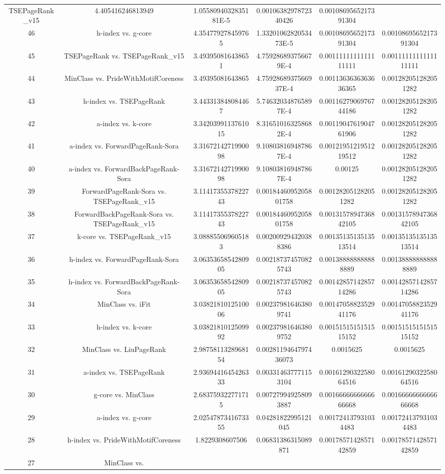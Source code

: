 \documentclass[a4paper,10pt]{article}
\begin{document}
\begin{landscape}
\begin{table}[!htp]
\begin{tabular}{cccccc}
TSEPageRank_v15&4.405416246813949&1.0558094032835181E-5&0.0010638297872340426&0.0010869565217391304\\46&h-index vs. g-core&4.354779278459765&1.3320106282053473E-5&0.0010869565217391304&0.0010869565217391304\\45&TSEPageRank vs. TSEPageRank_v15&3.493950816438651&4.759286893756679E-4&0.0011111111111111111&0.0011111111111111111\\44&MinClass vs. PrideWithMotifCoreness&3.49395081643865&4.7592868937566937E-4&0.0011363636363636365&0.001282051282051282\\43&h-index vs. TSEPageRank&3.443313848084467&5.746320348765897E-4&0.0011627906976744186&0.001282051282051282\\42&a-index vs. k-core&3.3420399113761015&8.316510163258682E-4&0.0011904761904761906&0.001282051282051282\\41&a-index vs. ForwardPageRank-Sora&3.3167214271990098&9.108038169487867E-4&0.0012195121951219512&0.001282051282051282\\40&a-index vs. ForwardBackPageRank-Sora&3.3167214271990098&9.108038169487867E-4&0.00125&0.001282051282051282\\39&ForwardPageRank-Sora vs. TSEPageRank_v15&3.1141735537822743&0.0018446095205801758&0.001282051282051282&0.001282051282051282\\38&ForwardBackPageRank-Sora vs. TSEPageRank_v15&3.1141735537822743&0.0018446095205801758&0.0013157894736842105&0.0013157894736842105\\37&k-core vs. TSEPageRank_v15&3.088855069605183&0.002009294320388386&0.0013513513513513514&0.0013513513513513514\\36&h-index vs. ForwardPageRank-Sora&3.0635365854280905&0.002187374570825743&0.001388888888888889&0.001388888888888889\\35&h-index vs. ForwardBackPageRank-Sora&3.0635365854280905&0.002187374570825743&0.0014285714285714286&0.0014285714285714286\\34&MinClass vs. iFit&3.0382181012510006&0.002379816463809741&0.0014705882352941176&0.0014705882352941176\\33&h-index vs. k-core&3.0382181012509992&0.002379816463809752&0.0015151515151515152&0.0015151515151515152\\32&MinClass vs. LiuPageRank&2.9875811328968154&0.0028119464797436073&0.0015625&0.0015625\\31&a-index vs. TSEPageRank&2.9369441645426333&0.003314637771153104&0.0016129032258064516&0.0016129032258064516\\30&g-core vs. MinClass&2.683759322771715&0.007279949258093887&0.0016666666666666668&0.0016666666666666668\\29&a-index vs. g-core&2.0254787341673355&0.04281822995121045&0.001724137931034483&0.001724137931034483\\28&h-index vs. PrideWithMotifCoreness&1.8229308607506&0.06831386315089871&0.0017857142857142859&0.0017857142857142859\\27&MinClass vs. 
\end{tabular}
\end{table}
\end{landscape}
\end{document}
